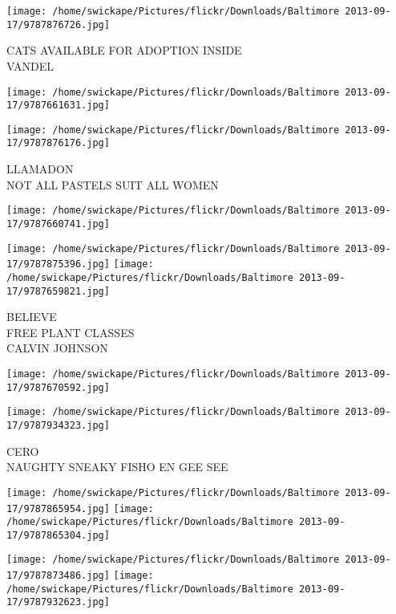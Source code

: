 \documentclass[10pt,letterpaper]{article}
\begin{document}
\vspace{0.25in}
\texttt{[image: /home/swickape/Pictures/flickr/Downloads/Baltimore 2013-09-17/9787876726.jpg]}

CATS AVAILABLE FOR ADOPTION INSIDE\\
VANDEL\\
\pagebreak

\texttt{[image: /home/swickape/Pictures/flickr/Downloads/Baltimore 2013-09-17/9787661631.jpg]}

\vspace{0.25in}
\texttt{[image: /home/swickape/Pictures/flickr/Downloads/Baltimore 2013-09-17/9787876176.jpg]}

LLAMADON\\
NOT ALL PASTELS SUIT ALL WOMEN\\
\pagebreak

\texttt{[image: /home/swickape/Pictures/flickr/Downloads/Baltimore 2013-09-17/9787660741.jpg]}

\vspace{0.25in}
\texttt{[image: /home/swickape/Pictures/flickr/Downloads/Baltimore 2013-09-17/9787875396.jpg]}
\texttt{[image: /home/swickape/Pictures/flickr/Downloads/Baltimore 2013-09-17/9787659821.jpg]}

BELIEVE\\
FREE PLANT CLASSES\\
CALVIN JOHNSON\\
\pagebreak

\texttt{[image: /home/swickape/Pictures/flickr/Downloads/Baltimore 2013-09-17/9787670592.jpg]}

\vspace{0.25in}
\texttt{[image: /home/swickape/Pictures/flickr/Downloads/Baltimore 2013-09-17/9787934323.jpg]}

CERO\\
NAUGHTY SNEAKY FISHO EN GEE SEE\\
\pagebreak

\texttt{[image: /home/swickape/Pictures/flickr/Downloads/Baltimore 2013-09-17/9787865954.jpg]}
\texttt{[image: /home/swickape/Pictures/flickr/Downloads/Baltimore 2013-09-17/9787865304.jpg]}

\texttt{[image: /home/swickape/Pictures/flickr/Downloads/Baltimore 2013-09-17/9787873486.jpg]}
\texttt{[image: /home/swickape/Pictures/flickr/Downloads/Baltimore 2013-09-17/9787932623.jpg]}
\end{document}
